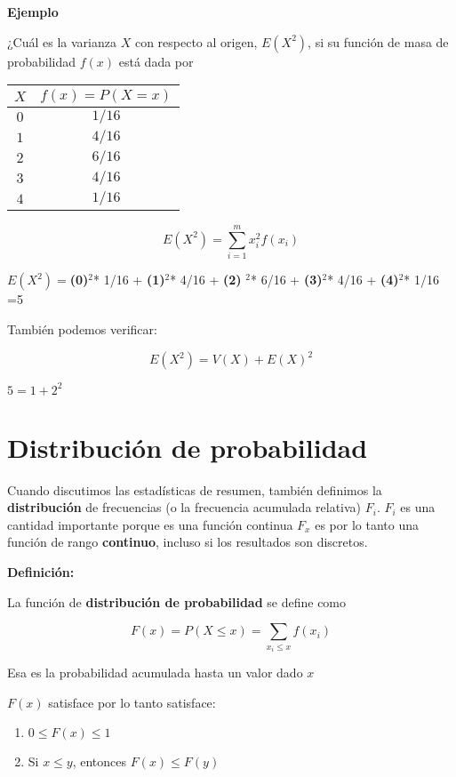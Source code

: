 \documentclass[
]{book}
\providecommand{\tightlist}{%
  \setlength{\itemsep}{0pt}\setlength{\parskip}{0pt}}
\begin{document}
\textbf{Ejemplo}

¿Cuál es la varianza \(X\) con respecto al origen, \(E(X^2)\), si su función de masa de probabilidad \(f(x)\) está dada por

\begin{longtable}[]{@{}cc@{}}
\toprule
\(X\) & \(f(x)=P(X=x)\) \\
\midrule
\endhead
\(0\) & \(1/16\) \\
\(1\) & \(4/16\) \\
\(2\) & \(6/16\) \\
\(3\) & \(4/16\) \\
\(4\) & \(1/16\) \\
\bottomrule
\end{longtable}

\[E(X^2) =\sum_{i=1}^m x_i^2 f(x_i)\]

\(E(X^2)=\)\textbf{(0)}\(^2\)* 1/16 + \textbf{(1)}\(^2\)* 4/16 + \textbf{(2)} \(^2\)* 6/16 + \textbf{(3)}\(^2\)* 4/16 + \textbf{(4)}\(^2\)* 1/16 =5

También podemos verificar:

\[E(X^2)=V(X)+E(X)^2\]

\(5=1+2^2\)

\hypertarget{distribuciuxf3n-de-probabilidad}{%
\section{Distribución de probabilidad}\label{distribuciuxf3n-de-probabilidad}}

Cuando discutimos las estadísticas de resumen, también definimos la \textbf{distribución} de frecuencias (o la frecuencia acumulada relativa) \(F_i\). \(F_i\) es una cantidad importante porque es una función continua \(F_x\) es por lo tanto una función de rango \textbf{continuo}, incluso si los resultados son discretos.

\textbf{Definición:}

La función de \textbf{distribución de probabilidad} se define como

\[F(x)=P(X\leq x)=\sum_{x_i\leq x} f(x_i) \]

Esa es la probabilidad acumulada hasta un valor dado \(x\)

\(F(x)\) satisface por lo tanto satisface:

\begin{enumerate}
\def\labelenumi{\arabic{enumi})}
\tightlist
\item
  \(0\leq F(x) \leq 1\)
\item
  Si \(x \leq y\), entonces \(F(x) \leq F(y)\)
\end{enumerate}
\end{document}
